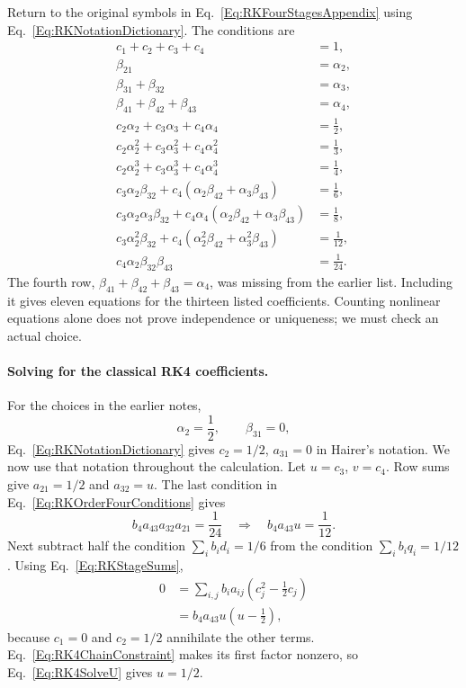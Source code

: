 Return to the original symbols in Eq.~\ref{Eq:RKFourStagesAppendix} using
Eq.~\ref{Eq:RKNotationDictionary}. The conditions are
\begin{equation}\label{Eq:RKFourStageConditionsAppendix}
\begin{aligned}
 c_1+c_2+c_3+c_4&=1,\\
 \beta_{21}&=\alpha_2,\\
 \beta_{31}+\beta_{32}&=\alpha_3,\\
 \beta_{41}+\beta_{42}+\beta_{43}&=\alpha_4,\\
 c_2\alpha_2+c_3\alpha_3+c_4\alpha_4&=\frac12,\\
 c_2\alpha_2^2+c_3\alpha_3^2+c_4\alpha_4^2&=\frac13,\\
 c_2\alpha_2^3+c_3\alpha_3^3+c_4\alpha_4^3&=\frac14,\\
 c_3\alpha_2\beta_{32}
             +c_4(\alpha_2\beta_{42}+\alpha_3\beta_{43})&=\frac16,\\
 c_3\alpha_2\alpha_3\beta_{32}
        +c_4\alpha_4(\alpha_2\beta_{42}+\alpha_3\beta_{43})&=\frac18,\\
 c_3\alpha_2^2\beta_{32}
           +c_4(\alpha_2^2\beta_{42}+\alpha_3^2\beta_{43})&=\frac1{12},\\
 c_4\alpha_2\beta_{32}\beta_{43}&=\frac1{24}.
\end{aligned}
\end{equation}
The fourth row, $\beta_{41}+\beta_{42}+\beta_{43}=\alpha_4$, was missing
from the earlier list. Including it gives eleven equations for the thirteen
listed coefficients. Counting nonlinear equations alone does not prove
independence or uniqueness; we must check an actual choice.

\paragraph{Solving for the classical RK4 coefficients.}
For the choices in the earlier notes,
\[
 \alpha_2=\frac12,\qquad \beta_{31}=0,
\]
Eq.~\ref{Eq:RKNotationDictionary} gives $c_2=1/2$, $a_{31}=0$ in
Hairer's notation. We now use that notation throughout the calculation.
Let $u=c_3$, $v=c_4$. Row sums give $a_{21}=1/2$ and $a_{32}=u$.
The last condition in Eq.~\ref{Eq:RKOrderFourConditions} gives
\begin{equation}\label{Eq:RK4ChainConstraint}
 b_4a_{43}a_{32}a_{21}=\frac1{24}
 \quad\Longrightarrow\quad b_4a_{43}u=\frac1{12}.
\end{equation}
Next subtract half the condition $\sum_i b_id_i=1/6$ from the
condition $\sum_i b_iq_i=1/12$. Using Eq.~\ref{Eq:RKStageSums},
\begin{align}
 0&=\sum_{i,j}b_i a_{ij}(c_j^2-\tfrac12c_j)\nonumber\\
  &=b_4a_{43}u(u-\tfrac12),\label{Eq:RK4SolveU}
\end{align}
because $c_1=0$ and $c_2=1/2$ annihilate the other terms.
Eq.~\ref{Eq:RK4ChainConstraint} makes its first factor nonzero, so
Eq.~\ref{Eq:RK4SolveU} gives $u=1/2$.

